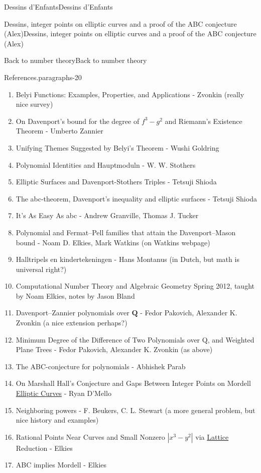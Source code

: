 \documentclass[10pt,]{book}
\numberwithin{equation}{section}
\newcommand{\QQ}{\mathbf{Q}}
\begin{document}
\begin{chapterptx}{Dessins d'Enfants}{}{Dessins d'Enfants}{}{}
\begin{sectionptx}{Dessins, integer points on elliptic curves and a proof of the ABC conjecture (Alex)}{}{Dessins, integer points on elliptic curves and a proof of the ABC conjecture (Alex)}{}{}
\begin{subsectionptx}{Back to number theory}{}{Back to number theory}{}{}
\begin{paragraphs}{References.}{paragraphs-20}
\begin{enumerate}
\item\hypertarget{li-151}{}Belyi Functions: Examples, Properties, and Applications - Zvonkin (really nice survey)%
\item\hypertarget{li-152}{}On Davenport’s bound for the degree of \(f^3 - g^2\) and Riemann's Existence Theorem - Umberto Zannier%
\item\hypertarget{li-153}{}Unifying Themes Suggested by Belyi's Theorem - Wushi Goldring%
\item\hypertarget{li-154}{}Polynomial Identities and Hauptmoduln - W. W. Stothers%
\item\hypertarget{li-155}{}Elliptic Surfaces and Davenport-Stothers Triples -  Tetsuji Shioda%
\item\hypertarget{li-156}{}The abc-theorem, Davenport’s inequality and elliptic surfaces - Tetsuji Shioda%
\item\hypertarget{li-157}{}It's As Easy As abc -  Andrew Granville, Thomas J. Tucker%
\item\hypertarget{li-158}{}Polynomial and Fermat–Pell families that attain the Davenport–Mason bound - Noam D. Elkies, Mark Watkins (on Watkins webpage)%
\item\hypertarget{li-159}{}Halltripels en kindertekeningen - Hans Montanus (in Dutch, but math is universal right?)%
\item\hypertarget{li-160}{}Computational Number Theory and Algebraic Geometry Spring 2012, taught by Noam Elkies, notes by Jason Bland%
\item\hypertarget{li-161}{}Davenport–Zannier polynomials over \(\QQ\) - Fedor Pakovich, Alexander K. Zvonkin (a nice extension perhaps?)%
\item\hypertarget{li-162}{}Minimum Degree of the Difference of Two Polynomials over Q, and Weighted Plane Trees -  Fedor Pakovich,  Alexander K. Zvonkin (as above)%
\item\hypertarget{li-163}{}The ABC-conjecture for polynomials - Abhishek Parab%
\item\hypertarget{li-164}{}On Marshall Hall's Conjecture and Gaps Between Integer Points on Mordell \hyperref[def-supersing-isog-ec]{Elliptic Curves} - Ryan D'Mello%
\item\hypertarget{li-165}{}Neighboring powers - F. Beukers, C. L. Stewart (a more general problem, but nice history and examples)%
\item\hypertarget{li-166}{}Rational Points Near Curves and Small Nonzero \(| x^3 - y^2|\) via \hyperref[def-buntes-lattice]{Lattice} Reduction - Elkies%
\item\hypertarget{li-167}{}ABC implies Mordell - Elkies%

\end{enumerate}
\end{paragraphs}
\end{subsectionptx}
\end{sectionptx}
\end{chapterptx}
\end{document}
